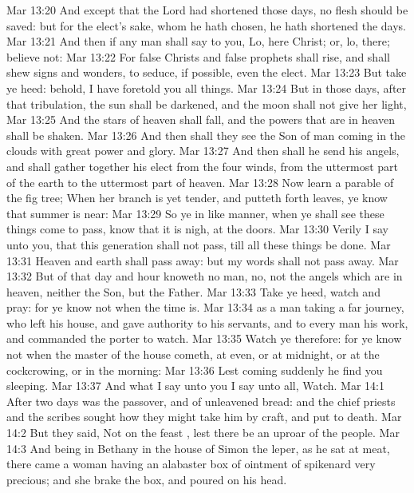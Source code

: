 \vs Mar 13:20 And except that the Lord had shortened those days, no flesh should be saved: but for the elect's sake, whom he hath chosen, he hath shortened the days.
\vs Mar 13:21 And then if any man shall say to you, Lo, here  Christ; or, lo,  there; believe  not:
\vs Mar 13:22 For false Christs and false prophets shall rise, and shall shew signs and wonders, to seduce, if  possible, even the elect.
\vs Mar 13:23 But take ye heed: behold, I have foretold you all things.
\vs Mar 13:24 But in those days, after that tribulation, the sun shall be darkened, and the moon shall not give her light,
\vs Mar 13:25 And the stars of heaven shall fall, and the powers that are in heaven shall be shaken.
\vs Mar 13:26 And then shall they see the Son of man coming in the clouds with great power and glory.
\vs Mar 13:27 And then shall he send his angels, and shall gather together his elect from the four winds, from the uttermost part of the earth to the uttermost part of heaven.
\vs Mar 13:28 Now learn a parable of the fig tree; When her branch is yet tender, and putteth forth leaves, ye know that summer is near:
\vs Mar 13:29 So ye in like manner, when ye shall see these things come to pass, know that it is nigh,  at the doors.
\vs Mar 13:30 Verily I say unto you, that this generation shall not pass, till all these things be done.
\vs Mar 13:31 Heaven and earth shall pass away: but my words shall not pass away.
\vs Mar 13:32 But of that day and  hour knoweth no man, no, not the angels which are in heaven, neither the Son, but the Father.
\vs Mar 13:33 Take ye heed, watch and pray: for ye know not when the time is.
\vs Mar 13:34  as a man taking a far journey, who left his house, and gave authority to his servants, and to every man his work, and commanded the porter to watch.
\vs Mar 13:35 Watch ye therefore: for ye know not when the master of the house cometh, at even, or at midnight, or at the cockcrowing, or in the morning:
\vs Mar 13:36 Lest coming suddenly he find you sleeping.
\vs Mar 13:37 And what I say unto you I say unto all, Watch.
\vs Mar 14:1 After two days was  the passover, and of unleavened bread: and the chief priests and the scribes sought how they might take him by craft, and put  to death.
\vs Mar 14:2 But they said, Not on the feast , lest there be an uproar of the people.
\vs Mar 14:3 And being in Bethany in the house of Simon the leper, as he sat at meat, there came a woman having an alabaster box of ointment of spikenard very precious; and she brake the box, and poured  on his head.
